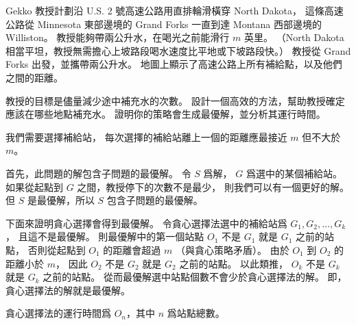 \startEXERCISE
Gekko 教授計劃沿 U.S. 2 號高速公路用直排輪滑橫穿 North Dakota，
這條高速公路從 Minnesota 東部邊境的 Grand Forks 一直到達 Montana 西部邊境的 Williston。
教授能夠帶兩公升水，在喝光之前能滑行 $m$ 英里。
（North Dakota 相當平坦，教授無需擔心上坡路段喝水速度比平地或下坡路段快。）
教授從 Grand Forks 出發，並攜帶兩公升水。
地圖上顯示了高速公路上所有補給點，以及他們之間的距離。

教授的目標是儘量減少途中補充水的次數。
設計一個高效的方法，幫助教授確定應該在哪些地點補充水。
證明你的策略會生成最優解，並分析其運行時間。
\stopEXERCISE

\startANSWER
我們需要選擇補給站，
每次選擇的補給站離上一個的距離應最接近 $m$ 但不大於 $m$。

首先，此問題的解包含子問題的最優解。
令 $S$ 爲解， $G$ 爲選中的某個補給站。
如果從起點到 $G$ 之間，教授停下的次數不是最少，
則我們可以有一個更好的解。
但 $S$ 是最優解，所以 $S$ 包含子問題的最優解。

下面來證明貪心選擇會得到最優解。
令貪心選擇法選中的補給站爲 $G_1,G_2,\ldots,G_k$，
且這不是最優解。
則最優解中的第一個站點 $O_1$ 不是 $G_1$ 就是 $G_1$ 之前的站點，
否則從起點到 $O_1$ 的距離會超過 $m$ （與貪心策略矛盾）。
由於 $O_1$ 到 $O_2$ 的距離小於 $m$，
因此 $O_2$ 不是 $G_2$ 就是 $G_2$ 之前的站點。
以此類推， $O_k$ 不是 $G_k$ 就是 $G_k$ 之前的站點。
從而最優解選中站點個數不會少於貪心選擇法的解。
即，貪心選擇法的解就是最優解。

貪心選擇法的運行時間爲 $O_n$，其中 $n$ 爲站點總數。
\stopANSWER
